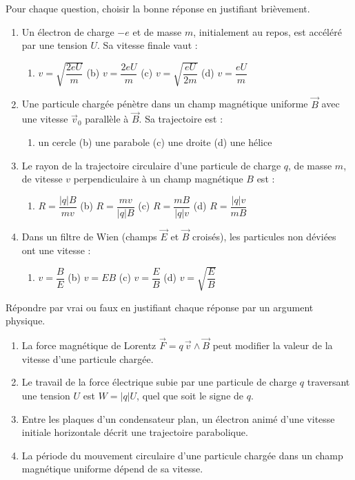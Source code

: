 \documentclass[11pt]{article}
\begin{document}
\begin{exercice}
Pour chaque question, choisir la bonne réponse en justifiant brièvement.
\begin{enumerate}
\item Un électron de charge $-e$ et de masse $m$, initialement au repos, est accéléré par une tension $U$. Sa vitesse finale vaut :
\begin{enumerate}
\item $v = \sqrt{\dfrac{2eU}{m}}$ \quad (b) $v = \dfrac{2eU}{m}$ \quad (c) $v = \sqrt{\dfrac{eU}{2m}}$ \quad (d) $v = \dfrac{eU}{m}$
\end{enumerate}
\item Une particule chargée pénètre dans un champ magnétique uniforme $\vec{B}$ avec une vitesse $\vec{v}_0$ parallèle à $\vec{B}$. Sa trajectoire est :
\begin{enumerate}
\item un cercle \quad (b) une parabole \quad (c) une droite \quad (d) une hélice
\end{enumerate}
\item Le rayon de la trajectoire circulaire d'une particule de charge $q$, de masse $m$, de vitesse $v$ perpendiculaire à un champ magnétique $B$ est :
\begin{enumerate}
\item $R = \dfrac{|q|B}{mv}$ \quad (b) $R = \dfrac{mv}{|q|B}$ \quad (c) $R = \dfrac{mB}{|q|v}$ \quad (d) $R = \dfrac{|q|v}{mB}$
\end{enumerate}
\item Dans un filtre de Wien (champs $\vec{E}$ et $\vec{B}$ croisés), les particules non déviées ont une vitesse :
\begin{enumerate}
\item $v = \dfrac{B}{E}$ \quad (b) $v = EB$ \quad (c) $v = \dfrac{E}{B}$ \quad (d) $v = \sqrt{\dfrac{E}{B}}$
\end{enumerate}
\end{enumerate}
\end{exercice}

\begin{exercice}
Répondre par vrai ou faux en justifiant chaque réponse par un argument physique.
\begin{enumerate}
\item La force magnétique de Lorentz $\vec{F} = q\,\vec{v} \wedge \vec{B}$ peut modifier la valeur de la vitesse d'une particule chargée.
\item Le travail de la force électrique subie par une particule de charge $q$ traversant une tension $U$ est $W = |q|U$, quel que soit le signe de $q$.
\item Entre les plaques d'un condensateur plan, un électron animé d'une vitesse initiale horizontale décrit une trajectoire parabolique.
\item La période du mouvement circulaire d'une particule chargée dans un champ magnétique uniforme dépend de sa vitesse.
\end{enumerate}
\end{exercice}
\end{document}
